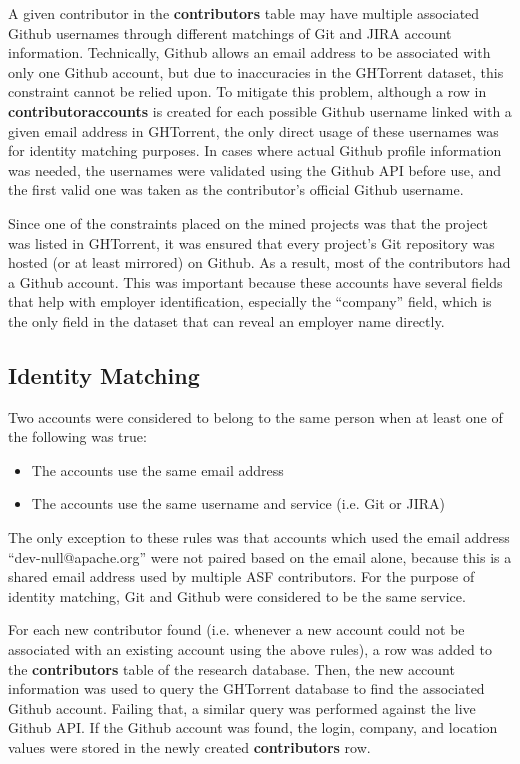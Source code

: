 A given contributor in the \textbf{contributors} table may have multiple associated Github usernames through different matchings of Git and JIRA account information. Technically, Github allows an email address to be associated with only one Github account, but due to inaccuracies in the GHTorrent dataset, this constraint cannot be relied upon. To mitigate this problem, although a row in \textbf{contributoraccounts} is created for each possible Github username linked with a given email address in GHTorrent, the only direct usage of these usernames was for identity matching purposes. In cases where actual Github profile information was needed, the usernames were validated using the Github API before use, and the first valid one was taken as the contributor's official Github username.

Since one of the constraints placed on the mined projects was that the project was listed in GHTorrent, it was ensured that every project's Git repository was hosted (or at least mirrored) on Github. As a result, most of the contributors had a Github account. This was important because these accounts have several fields that help with employer identification, especially the ``company'' field, which is the only field in the dataset that can reveal an employer name directly.
\subsection{Identity Matching}\label{mergingsec}
Two accounts were considered to belong to the same person when at least one of the following was true:
\begin{itemize}
	\item The accounts use the same email address
	\item The accounts use the same username and service (i.e. Git or JIRA)
\end{itemize}
The only exception to these rules was that accounts which used the email address ``dev-null@apache.org'' were not paired based on the email alone, because this is a shared email address used by multiple ASF contributors. For the purpose of identity matching, Git and Github were considered to be the same service.

For each new contributor found (i.e. whenever a new account could not be associated with an existing account using the above rules), a row was added to the \textbf{contributors} table of the research database. Then, the new account information was used to query the GHTorrent database to find the associated Github account. Failing that, a similar query was performed against the live Github API. If the Github account was found, the login, company, and location values were stored in the newly created \textbf{contributors} row.

